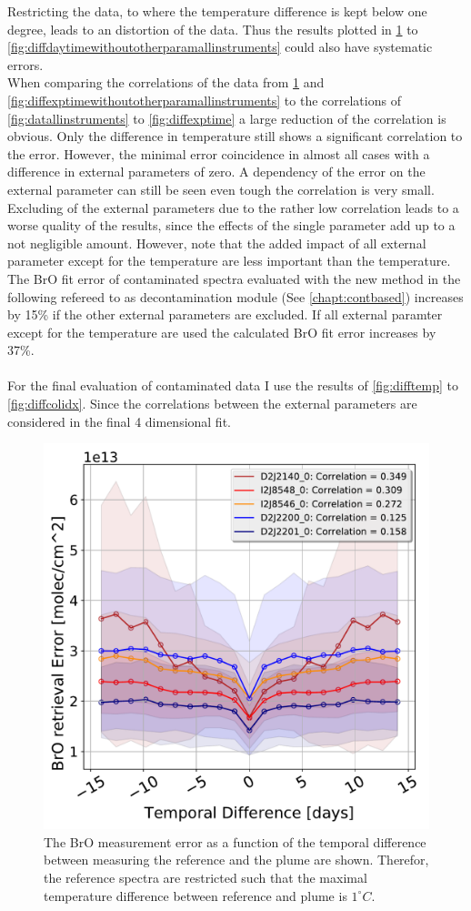 \documentclass  [
  paper    = a4,
  BCOR     = 10mm,
  twoside,
  fontsize = 12pt,
  fleqn,
  toc      = bibnumbered,
  toc      = listofnumbered,
  numbers  = noendperiod,
  headings = normal,
  listof   = leveldown,
  version  = 3.03
]                                       {scrreprt}
\begin{document}
	Restricting the data, to where the temperature difference is kept below one degree, leads to an distortion of the data. Thus the results plotted in \cref{fig:datwithoutotherparamallinstruments} to \cref{fig:diffdaytimewithoutotherparamallinstruments} could also have systematic errors.\\
	When comparing the correlations of the data from \cref{fig:datwithoutotherparamallinstruments} and \cref{fig:diffexptimewithoutotherparamallinstruments}  to the correlations of 
	\cref{fig:datallinstruments} to \cref{fig:diffexptime} a large reduction of the correlation is obvious. Only the difference in temperature still shows a significant correlation to the   error. However, the minimal   error coincidence in almost all cases with a difference in external parameters of zero. A dependency of the   error on the external parameter can still be seen even tough the correlation is very small. \\
	Excluding of the external parameters due to the rather low correlation leads to a worse quality of the results, since the effects of the single parameter add up to a not negligible amount. However, note that  the added impact of all external parameter except for the temperature are less important than the temperature.
	The BrO fit error of contaminated spectra evaluated with the new method in the following refereed to as decontamination module (See \cref{chapt:contbased}) increases by 15\% if the other external parameters are excluded. If all external paramter except for the temperature are used the calculated BrO fit error increases by 37\%.\\
	\\
	For the final evaluation of contaminated data I use the results of \cref{fig:difftemp} to \cref{fig:diffcolidx}. Since the correlations between the external parameters are considered in the final 4 dimensional fit.\\
	\begin{figure}[h]
		\centering
		\includegraphics[width=0.5\linewidth]{Bilder/BrOErr_OhnEVar/DatwithoutOtherparamallInstruments}
		\caption{The BrO measurement error as a function of the temporal difference between measuring the reference and the plume are shown. Therefor, the reference spectra are restricted such that the maximal temperature difference between reference and plume is $1^\circ C$.}
		\label{fig:datwithoutotherparamallinstruments}
	\end{figure}
\end{document}
